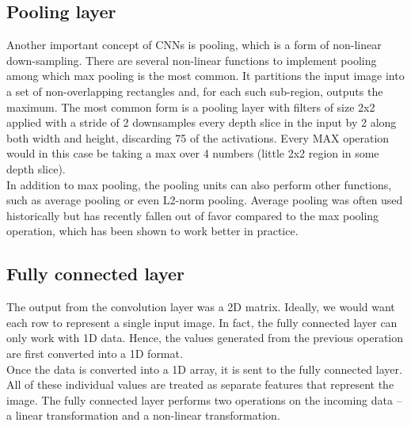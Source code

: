 \subsection{Pooling layer}
Another important concept of CNNs is pooling, which is a form of non-linear down-sampling. There are several non-linear functions to implement pooling among which max pooling is the most common. It partitions the input image into a set of non-overlapping rectangles and, for each such sub-region, outputs the maximum. The most common form is a pooling layer with filters of size 2x2 applied with a stride of 2 downsamples every depth slice in the input by 2 along both width and height, discarding 75 %
of the activations. Every MAX operation would in this case be taking a max over 4 numbers (little 2x2 region in some depth slice). \\
In addition to max pooling, the pooling units can also perform other functions, such as average pooling or even L2-norm pooling. Average pooling was often used historically but has recently fallen out of favor compared to the max pooling operation, which has been shown to work better in practice.\\

\subsection{Fully connected layer}
The output from the convolution layer was a 2D matrix. Ideally, we would want each row to represent a single input image. In fact, the fully connected layer can only work with 1D data. Hence, the values generated from the previous operation are first converted into a 1D format.\\
Once the data is converted into a 1D array, it is sent to the fully connected layer. All of these individual values are treated as separate features that represent the image. The fully connected layer performs two operations on the incoming data – a linear transformation and a non-linear transformation.\\

